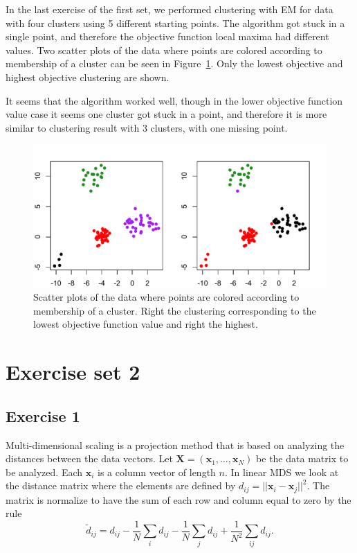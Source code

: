 \documentclass{article}
\renewcommand\vec[1]{\ensuremath{\mathbf{#1}}}
\begin{document}
In the last exercise of the first set, we performed clustering with EM
for data with four clusters using 5 different starting points. The
algorithm got stuck in a single point, and therefore the objective
function local maxima had different values. Two scatter plots of the data
where points are colored according to membership of a cluster can be
seen in Figure~\ref{fig:4cluster}. Only the lowest objective and
highest objective clustering are shown.

It seems that the algorithm worked well, though in the lower objective
function value case it seems one cluster got stuck in a point, and
therefore it is more similar to clustering result with 3 clusters,
with one missing point.

\begin{figure}[h!]
	\includegraphics[width=\columnwidth]{4cluster.pdf}
	\caption{Scatter plots of the data
where points are colored according to membership of a cluster. Right
the clustering corresponding to the lowest objective function value and
right the highest.}\label{fig:4cluster}
\end{figure}



\section{Exercise set 2}
\subsection{Exercise 1}\label{sec:ex21}
Multi-dimensional scaling is a projection method that is based on analyzing the distances between the data vectors.
Let $\vec X=(\vec x_1,\dots,\vec x_N)$ be the data matrix to be analyzed.
Each $\vec x_i$ is a column vector of length $n$.
In linear MDS we look at the distance matrix where the elements are defined by $d_{ij}=||\vec x_i-\vec x_j||^2$.
The matrix is normalize to have the sum of each row and column equal to zero by the rule
$$ \tilde{d}_{ij} = d_{ij} - \frac{1}{N}\sum_id_{ij} - \frac{1}{N}\sum_jd_{ij} + \frac{1}{N^2}\sum_{ij}d_{ij}. $$
\end{document}
